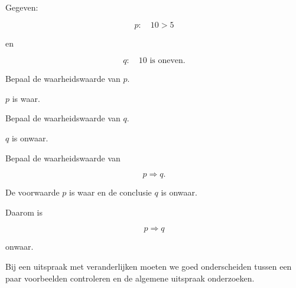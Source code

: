 \documentclass{ximera}
\begin{document}
\begin{oefening}{\oefB\ESS}

Gegeven:

\[
p:\quad 10>5
\]

en

\[
q:\quad 10\text{ is oneven}.
\]

\begin{question}

Bepaal de waarheidswaarde van $p$.

\begin{oplossing}

$p$ is waar.

\end{oplossing}

\end{question}

\begin{question}

Bepaal de waarheidswaarde van $q$.

\begin{oplossing}

$q$ is onwaar.

\end{oplossing}

\end{question}

\begin{question}

Bepaal de waarheidswaarde van

\[
p\Rightarrow q.
\]

\begin{oplossing}

De voorwaarde $p$ is waar en de conclusie $q$ is onwaar.

Daarom is

\[
p\Rightarrow q
\]

onwaar.

\end{oplossing}

\end{question}

\end{oefening}



Bij een uitspraak met veranderlijken moeten we goed onderscheiden tussen
een paar voorbeelden controleren en de algemene uitspraak onderzoeken.
\end{document}
